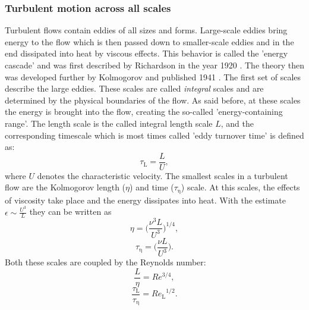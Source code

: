 \documentclass[11pt,a4paper,openany,oneside,parskip=half*]{article}
\begin{document}
\subsubsection{Turbulent motion across all scales}
Turbulent flows contain eddies of all sizes and forms. Large-scale eddies bring energy to the flow which is then passed down to smaller-scale eddies and in the end dissipated into heat by viscous effects. This behavior is called the 'energy cascade' and was first described by Richardson in the year 1920 \cite{Richardson1920}. The theory then was developed further by Kolmogorov and published 1941 \cite{Kolmogorov1941}.
\newline
The first set of scales describe the large eddies. These scales are called \textit{integral} scales and are determined by the physical boundaries of the flow. As said before, at these scales the energy is brought into the flow, creating the so-called 'energy-containing range'. The length scale is the called integral length scale $L$, and the corresponding timescale which is most times called 'eddy turnover time' is defined as:
\begin{equation}
\tau_\mathrm{L} = \frac{L}{U},
\end{equation}
where $U$ denotes the characteristic velocity.
\newline
The smallest scales in a turbulent flow are the Kolmogorov length ($\eta$) and time ($\tau_\mathrm{\eta}$) scale. At this scales, the effects of viscosity take place and the energy dissipates into heat. With the estimate $\epsilon \sim \frac{U^3}{L} $ they can be written as
\begin{equation}
\eta = \biggl (\frac{\nu^3 L}{U^3} \biggl )^{1/4},
\end{equation}
\begin{equation}
\tau_\mathrm{\eta} = \biggl (\frac{\nu L}{U^3} \biggl ).
\end{equation}
Both these scales are coupled by the Reynolds number:
\begin{equation}
\frac{L}{\eta} = Re^{3/4},
\end{equation}
\begin{equation}
\frac{\tau_\mathrm{L}}{\tau_\mathrm{\eta}} = {Re_\mathrm{L}}^{1/2}.
\end{equation}
\end{document}

